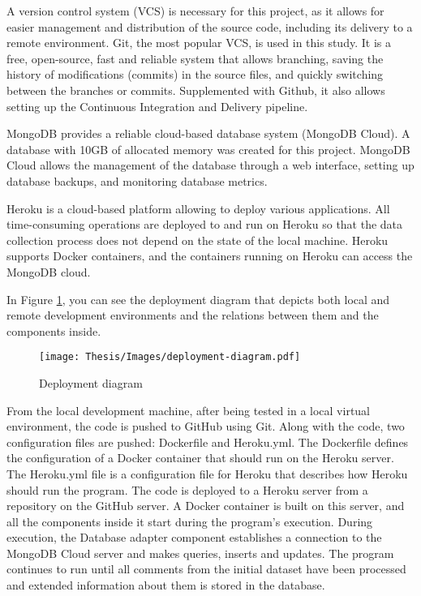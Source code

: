 A version control system (VCS) is necessary for this project, as it allows for easier management and distribution of the source code, including its delivery to a remote environment. Git, the most popular VCS, is used in this study. It is a free, open-source, fast and reliable system that allows branching, saving the history of modifications (commits) in the source files, and quickly switching between the branches or commits. Supplemented with Github, it also allows setting up the Continuous Integration and Delivery pipeline.

MongoDB provides a reliable cloud-based database system (MongoDB Cloud). A database with 10GB of allocated memory was created for this project. MongoDB Cloud allows the management of the database through a web interface, setting up database backups, and monitoring database metrics.

Heroku is a cloud-based platform allowing to deploy various applications. All time-consuming operations are deployed to and run on Heroku so that the data collection process does not depend on the state of the local machine. Heroku supports Docker containers, and the containers running on Heroku can access the MongoDB cloud.

In Figure \ref{fig:deployment-diagram}, you can see the deployment diagram that depicts both local and remote development environments and the relations between them and the components inside.

\begin{figure}
	\centering
	\texttt{[image: Thesis/Images/deployment-diagram.pdf]}
	\caption{Deployment diagram}
	\label{fig:deployment-diagram}
\end{figure}

From the local development machine, after being tested in a local virtual environment, the code is pushed to GitHub using Git. Along with the code, two configuration files are pushed: Dockerfile and Heroku.yml. The Dockerfile defines the configuration of a Docker container that should run on the Heroku server. The Heroku.yml file is a configuration file for Heroku that describes how Heroku should run the program. The code is deployed to a Heroku server from a repository on the GitHub server. A Docker container is built on this server, and all the components inside it start during the program's execution. During execution, the Database adapter component establishes a connection to the MongoDB Cloud server and makes queries, inserts and updates. The program continues to run until all comments from the initial dataset have been processed and extended information about them is stored in the database.

